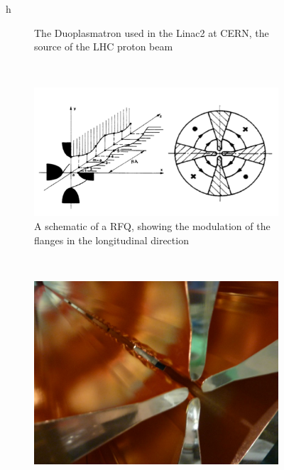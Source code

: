 \begin{figure}{h}
\begin{subfigure}[h]{0.4\textwidth}
        \caption{The Duoplasmatron used in the Linac2 at CERN, the
          source of the LHC proton beam \cite{LHC:LHC_linac2_duoplasmatron_image}}\label{fig:duoplasmatron_actual}
      \end{subfigure}
       ~ %
      \begin{subfigure}[h]{0.4\textwidth}
        \includegraphics[width=\textwidth]{Figures/LHC_Diagrams/LHC__Linac2__RFQ_schematic.jpg}
        \caption{A schematic of a RFQ, showing the modulation of the
          flanges in the longitudinal direction \cite{LHC:LHC_linac2_rfq_schematic}}\label{fig:rfq_schematic}
      \end{subfigure}
       ~ %
      \begin{subfigure}[h]{0.4\textwidth}
        \includegraphics[width=\textwidth]{Figures/LHC_Diagrams/LHC__Linac2__RFQ.jpg}

\end{subfigure}
\end{figure}

